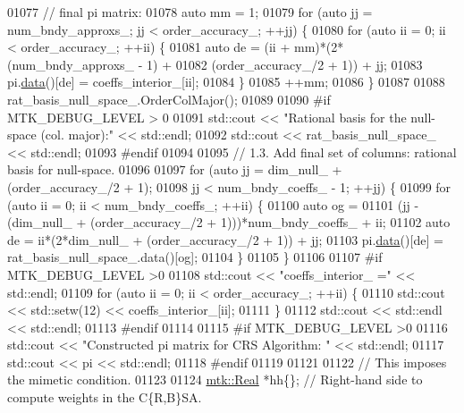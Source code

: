 \begin{DoxyCode}
{{01077   \textcolor{comment}{// final pi matrix:}
01078   \textcolor{keyword}{auto} mm = 1;
01079   \textcolor{keywordflow}{for} (\textcolor{keyword}{auto} jj = num\_bndy\_approxs\_; jj < order\_accuracy\_; ++jj) \{
01080     \textcolor{keywordflow}{for} (\textcolor{keyword}{auto} ii = 0; ii < order\_accuracy\_; ++ii) \{
01081       \textcolor{keyword}{auto} de = (ii + mm)*(2*(num\_bndy\_approxs\_ - 1) +
01082         (order\_accuracy\_/2 + 1)) + jj;
01083       pi.\hyperlink{classmtk_1_1DenseMatrix_a16b3ff56feb2658b9fc7147d1de4d8e7}{data}()[de] = coeffs\_interior\_[ii];
01084     \}
01085     ++mm;
01086   \}
01087 
01088   rat\_basis\_null\_space\_.OrderColMajor();
01089 
01090 \textcolor{preprocessor}{  #if MTK\_DEBUG\_LEVEL > 0}
01091   std::cout << \textcolor{stringliteral}{"Rational basis for the null-space (col. major):"} << std::endl;
01092   std::cout << rat\_basis\_null\_space\_ << std::endl;
01093 \textcolor{preprocessor}{  #endif}
01094 
01095   \textcolor{comment}{// 1.3. Add final set of columns: rational basis for null-space.}
01096 
01097   \textcolor{keywordflow}{for} (\textcolor{keyword}{auto} jj = dim\_null\_ + (order\_accuracy\_/2 + 1);
01098        jj < num\_bndy\_coeffs\_ - 1; ++jj) \{
01099     \textcolor{keywordflow}{for} (\textcolor{keyword}{auto} ii = 0; ii < num\_bndy\_coeffs\_; ++ii) \{
01100       \textcolor{keyword}{auto} og =
01101         (jj - (dim\_null\_ + (order\_accuracy\_/2 + 1)))*num\_bndy\_coeffs\_ + ii;
01102       \textcolor{keyword}{auto} de = ii*(2*dim\_null\_ + (order\_accuracy\_/2 + 1)) + jj;
01103       pi.\hyperlink{classmtk_1_1DenseMatrix_a16b3ff56feb2658b9fc7147d1de4d8e7}{data}()[de] = rat\_basis\_null\_space\_.data()[og];
01104     \}
01105   \}
01106 
01107 \textcolor{preprocessor}{  #if MTK\_DEBUG\_LEVEL >0}
01108   std::cout << \textcolor{stringliteral}{"coeffs\_interior\_ ="} << std::endl;
01109   \textcolor{keywordflow}{for} (\textcolor{keyword}{auto} ii = 0; ii < order\_accuracy\_; ++ii) \{
01110     std::cout << std::setw(12) << coeffs\_interior\_[ii];
01111   \}
01112   std::cout << std::endl << std::endl;
01113 \textcolor{preprocessor}{  #endif}
01114 
01115 \textcolor{preprocessor}{  #if MTK\_DEBUG\_LEVEL >0}
01116   std::cout << \textcolor{stringliteral}{"Constructed pi matrix for CRS Algorithm: "} << std::endl;
01117   std::cout << pi << std::endl;
01118 \textcolor{preprocessor}{  #endif}
01119 
01121 
01122   \textcolor{comment}{// This imposes the mimetic condition.}
01123 
01124   \hyperlink{group__c01-roots_gac080bbbf5cbb5502c9f00405f894857d}{mtk::Real} *hh\{\};  \textcolor{comment}{// Right-hand side to compute weights in the C\{R,B\}SA.}
}}
\end{DoxyCode}
